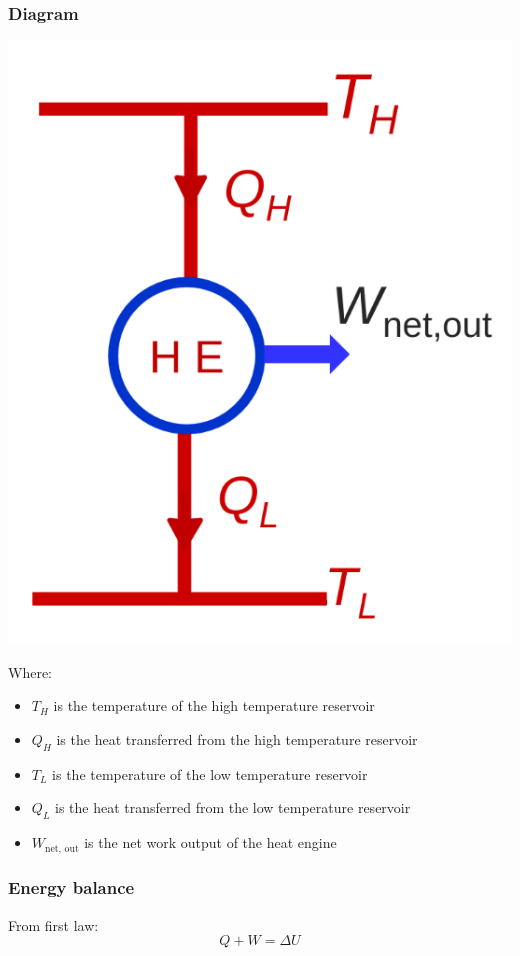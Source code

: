 \documentclass[11pt]{article}
\begin{document}
\subsubsection{Diagram}
\label{sec:orgcbe229b}
\begin{center}
\includegraphics[width=.9\linewidth]{./images/heat-engine-diagram.png}
\end{center}

Where:
\begin{itemize}
\item \(T_H\) is the temperature of the high temperature reservoir
\item \(Q_H\) is the heat transferred from the high temperature reservoir
\item \(T_L\) is the temperature of the low temperature reservoir
\item \(Q_L\) is the heat transferred from the low temperature reservoir
\item \(W_{\text{net, out}}\) is the net work output of the heat engine
\end{itemize}

\subsubsection{Energy balance}
\label{sec:orgb0326c8}
From first law:
\[Q + W = \Delta U\]
\end{document}
